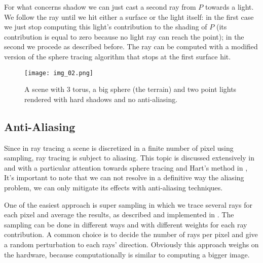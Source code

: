 For what concerns shadow we can just cast a second ray from $P$ towards a light.
We follow the ray until we hit either a surface or the light itself:
in the first case we just stop computing this light's contribution to the shading of $P$ (its contribution is equal to zero because no light ray can reach the point);
in the second we procede as described before.
The ray can be computed with a modified version of the sphere tracing algorithm that stops at the first surface hit.
\begin{figure}[!htb]
  \texttt{[image: img\_02.png]}
  \caption{A scene with 3 torus, a big sphere (the terrain) and two point lights rendered with hard shadows and no anti-aliasing.}
\end{figure}

\subsection{Anti-Aliasing}
Since in ray tracing a scene is discretized in a finite number of pixel using sampling, ray tracing is subject to aliasing.
This topic is discussed extensively in \cite{rt_groundup} and with a particular attention towards sphere tracing and Hart's method in \cite{hart1996, scratch_sdf}, 
It's important to note that we can not resolve in a definitive way the aliasing problem, we can only mitigate its effects with anti-aliasing techniques.

One of the easiest approach is super sampling in which we trace several rays for each pixel and average the results, as described and implemented in \cite{rt_one_weekend}.
The sampling can be done in different ways and with different weights for each ray contribution.
A common choice is to decide the number of rays per pixel and give a random perturbation to each rays' direction.
Obviously this approach weighs on the hardware, because computationally is similar to computing a bigger image.

